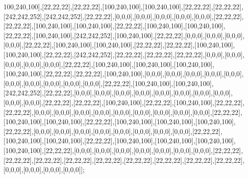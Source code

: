 100,240,100],[22,22,22],[22,22,22],[100,240,100],[100,240,100],[22,22,22],[22,22,22],[242,242,252],[242,242,252],[22,22,22],[0,0,0],[0,0,0],[0,0,0],[0,0,0],[0,0,0],[22,22,22],[22,22,22],[100,240,100],[100,240,100],[22,22,22],[100,240,100],[100,240,100],[22,22,22],[100,240,100],[242,242,252],[100,240,100],[22,22,22],[0,0,0],[0,0,0],[0,0,0],[0,0,0],[22,22,22],[100,240,100],[100,240,100],[22,22,22],[22,22,22],[100,240,100],[100,240,100],[22,22,22],[242,242,252],[22,22,22],[22,22,22],[22,22,22],[0,0,0],[0,0,0],[0,0,0],[0,0,0],[0,0,0],[22,22,22],[100,240,100],[100,240,100],[100,240,100],[100,240,100],[22,22,22],[22,22,22],[100,240,100],[0,0,0],[0,0,0],[0,0,0],[0,0,0],[0,0,0],[0,0,0],[0,0,0],[0,0,0],[0,0,0],[0,0,0],[22,22,22],[100,240,100],[100,240,100],[242,242,252],[22,22,22],[0,0,0],[0,0,0],[0,0,0],[0,0,0],[0,0,0],[0,0,0],[0,0,0],[0,0,0],[0,0,0],[0,0,0],[22,22,22],[22,22,22],[100,240,100],[22,22,22],[100,240,100],[22,22,22],[22,22,22],[0,0,0],[0,0,0],[0,0,0],[0,0,0],[0,0,0],[0,0,0],[0,0,0],[0,0,0],[0,0,0],[22,22,22],[100,240,100],[100,240,100],[22,22,22],[100,240,100],[100,240,100],[100,240,100],[22,22,22],[0,0,0],[0,0,0],[0,0,0],[0,0,0],[0,0,0],[0,0,0],[0,0,0],[0,0,0],[22,22,22],[100,240,100],[100,240,100],[22,22,22],[100,240,100],[100,240,100],[100,240,100],[100,240,100],[22,22,22],[0,0,0],[0,0,0],[0,0,0],[0,0,0],[0,0,0],[0,0,0],[0,0,0],[22,22,22],[22,22,22],[22,22,22],[22,22,22],[22,22,22],[22,22,22],[22,22,22],[22,22,22],[22,22,22],[0,0,0],[0,0,0],[0,0,0],[0,0,0]];

